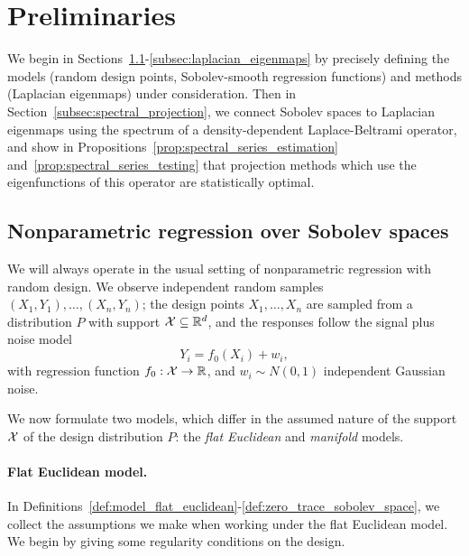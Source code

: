 \section{Preliminaries}
\label{sec:setup_main_results}

We begin in Sections~\ref{subsec:regression_laplacian_eigenmaps}-\ref{subsec:laplacian_eigenmaps} by precisely defining the models (random design points, Sobolev-smooth regression functions) and methods (Laplacian eigenmaps) under consideration. Then in Section~\ref{subsec:spectral_projection}, we connect Sobolev spaces to Laplacian eigenmaps using the spectrum of a density-dependent Laplace-Beltrami operator, and show in Propositions~\ref{prop:spectral_series_estimation} and~\ref{prop:spectral_series_testing} that projection methods which use the eigenfunctions of this operator are statistically optimal.

\subsection{Nonparametric regression over Sobolev spaces}
\label{subsec:regression_laplacian_eigenmaps}

We will always operate in the usual setting of nonparametric regression with random design. We observe independent random samples $(X_1,Y_1),\ldots,(X_n,Y_n)$; the design points $X_1,\ldots,X_n$ are sampled from a distribution $P$ with support $\mathcal{X} \subseteq \mathbb{R}^d$, and the responses follow the signal plus noise model
\begin{equation}
\label{eqn:model}
Y_i = f_0(X_i) + w_i,
\end{equation}
with regression function $f_0: \mathcal{X} \to \mathbb{R}$, and $w_i \sim N(0,1)$ independent Gaussian noise. 

We now formulate two models, which differ in the assumed nature of the support $\mathcal{X}$ of the design distribution $P$: the \emph{flat Euclidean} and \emph{manifold} models.

\paragraph{Flat Euclidean model.}
In Definitions~\ref{def:model_flat_euclidean}-\ref{def:zero_trace_sobolev_space}, we collect the assumptions we make when working under the flat Euclidean model. We begin by giving some regularity conditions on the design.

